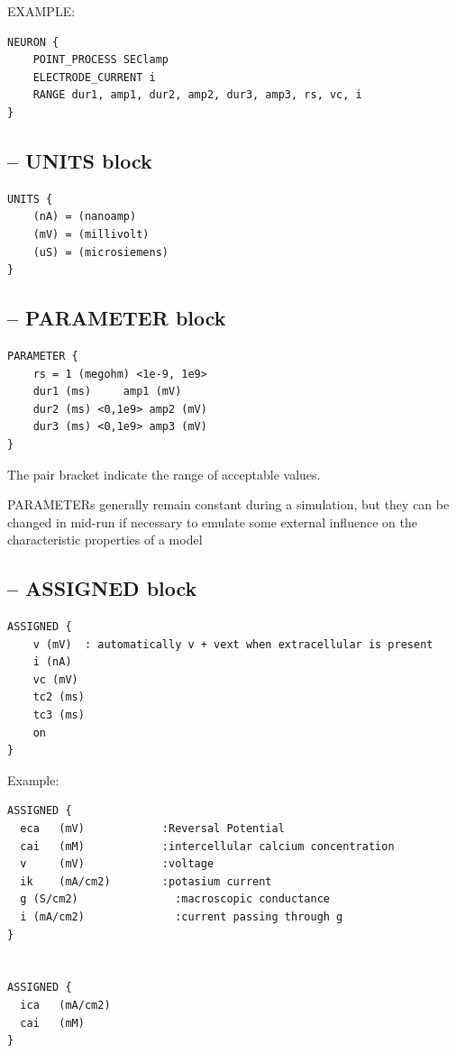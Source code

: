 EXAMPLE:
\begin{verbatim}
NEURON {
	POINT_PROCESS SEClamp
	ELECTRODE_CURRENT i
	RANGE dur1, amp1, dur2, amp2, dur3, amp3, rs, vc, i
}
\end{verbatim}


\subsection{-- UNITS block}

\begin{verbatim}
UNITS {
	(nA) = (nanoamp)
	(mV) = (millivolt)
	(uS) = (microsiemens)
}
\end{verbatim}

\subsection{-- PARAMETER block}

\begin{verbatim}
PARAMETER {
	rs = 1 (megohm) <1e-9, 1e9>
	dur1 (ms) 	  amp1 (mV)
	dur2 (ms) <0,1e9> amp2 (mV)
	dur3 (ms) <0,1e9> amp3 (mV)
}
\end{verbatim}
The pair bracket indicate the range of acceptable values. 

PARAMETERs generally remain constant
during a simulation, but they can be changed in mid-run if necessary to emulate
some external influence on the characteristic properties of a model


\subsection{-- ASSIGNED block}
\label{sec:ASSIGNED-block-NEURON}

\begin{verbatim}
ASSIGNED {
	v (mV)	: automatically v + vext when extracellular is present
	i (nA)
	vc (mV)
	tc2 (ms)
	tc3 (ms)
	on
}
\end{verbatim}

Example:
\begin{verbatim}
ASSIGNED {
  eca   (mV)            :Reversal Potential
  cai   (mM)            :intercellular calcium concentration
  v     (mV)            :voltage
  ik    (mA/cm2)        :potasium current
  g (S/cm2)               :macroscopic conductance
  i (mA/cm2)              :current passing through g
}


ASSIGNED {
  ica   (mA/cm2)
  cai   (mM)
}
\end{verbatim}


